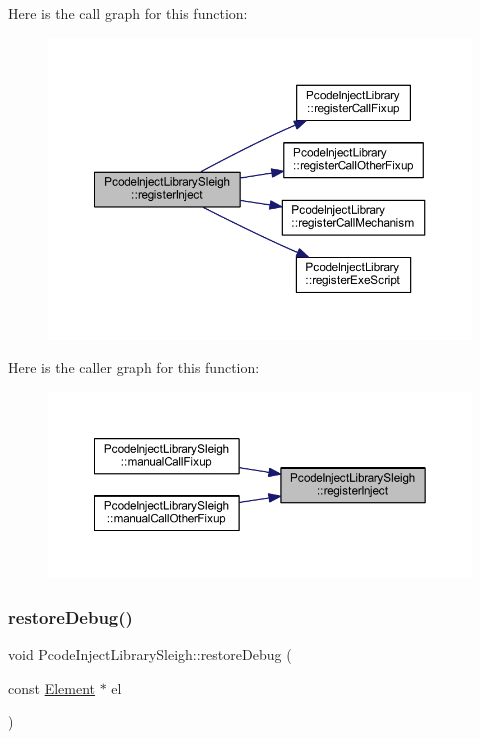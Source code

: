 Here is the call graph for this function\+:
\nopagebreak
\begin{figure}[H]
\begin{center}
\leavevmode
\includegraphics[width=350pt]{class_pcode_inject_library_sleigh_a8aa3b83b22fef0799e95dfaf346ca89e_cgraph}
\end{center}
\end{figure}
Here is the caller graph for this function\+:
\nopagebreak
\begin{figure}[H]
\begin{center}
\leavevmode
\includegraphics[width=350pt]{class_pcode_inject_library_sleigh_a8aa3b83b22fef0799e95dfaf346ca89e_icgraph}
\end{center}
\end{figure}
\mbox{\label{class_pcode_inject_library_sleigh_a121a82e796311b4d5b163cdf773e2235}} 
\subsubsection{\texorpdfstring{restoreDebug()}{restoreDebug()}}
{\footnotesize\ttfamily void Pcode\+Inject\+Library\+Sleigh\+::restore\+Debug (\begin{DoxyParamCaption}\item[{const \mbox{\hyperlink{class_element}{Element}} $\ast$}]{el }\end{DoxyParamCaption})\hspace{0.3cm}{\ttfamily [virtual]}}



